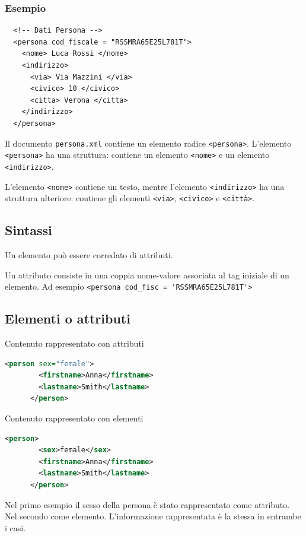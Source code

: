 \documentclass[oneside,a4paper,11pt]{book}
\theoremstyle{italicstyle}
\theoremstyle{normStyle}
\begin{document}
\subsubsection{Esempio}
\begin{lstlisting}
  <!-- Dati Persona -->
  <persona cod_fiscale = "RSSMRA65E25L781T">
    <nome> Luca Rossi </nome>
    <indirizzo>
      <via> Via Mazzini </via>
      <civico> 10 </civico>
      <citta> Verona </citta>
    </indirizzo>
  </persona>
\end{lstlisting}
Il documento \verb|persona.xml| contiene un elemento radice \verb|<persona>|.
L'elemento \verb|<persona>| ha una struttura: contiene un elemento \verb|<nome>| e un elemento 
\verb|<indirizzo>|.

L'elemento \verb|<nome>| contiene un testo, mentre l'elemento \verb|<indirizzo>| ha una struttura ulteriore:
contiene gli elementi \verb|<via>|, \verb|<civico>| e \verb|<città>|.
\subsection{Sintassi}
Un elemento può essere corredato di attributi.

Un attributo consiste in una coppia nome-valore associata al tag iniziale 
di un elemento. Ad esempio \verb|<persona cod_fisc = 'RSSMRA65E25L781T'>|
\subsection{Elementi o attributi}
\begin{minipage}[t]{0.48\textwidth}
Contenuto rappresentato con attributi
  \begin{lstlisting}[language=XML]
      <person sex="female">
        <firstname>Anna</firstname>
        <lastname>Smith</lastname>
      </person>
  \end{lstlisting}
\end{minipage}
  \hfill
\begin{minipage}[t]{0.48\textwidth}
    Contenuto rappresentato con elementi
  \begin{lstlisting}[language=XML]
      <person>
        <sex>female</sex>
        <firstname>Anna</firstname>
        <lastname>Smith</lastname>
      </person>
  \end{lstlisting}
\end{minipage}
Nel primo esempio il sesso della persona è stato rappresentato come attributo.
Nel secondo come elemento. L'informazione rappresentata è la stessa in entrambe i casi.
\end{document}
